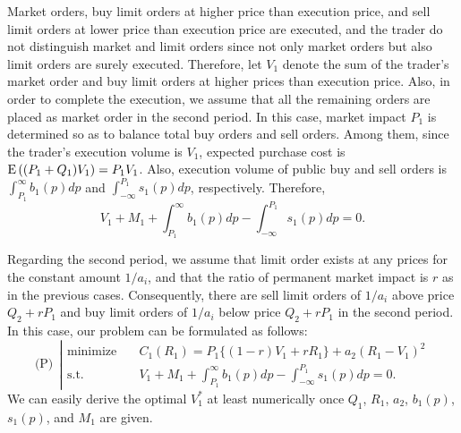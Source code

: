 Market orders, buy limit orders at higher price than execution price, and sell limit orders at lower price than execution price are executed, and the trader do not distinguish market and limit orders since not only market orders but also limit orders are surely executed.  Therefore, let $V_1$ denote the sum of the trader's market order and buy limit orders at higher prices than execution price.  Also, in order to complete the execution, we assume that all the remaining orders are placed as market order in the second period.  In this case, market impact $P_1$ is determined so as to balance total buy orders and sell orders.  Among them, since the trader's execution volume is $V_1$, expected purchase cost is ${\mathrm{E}}\left( (P_1+Q_1)V_1 \right)=P_1V_1$.  Also, execution volume of public buy and sell orders is $\displaystyle \int_{P_1}^{\infty} b_1(p) dp$ and $\displaystyle \int_{-\infty}^{P_1} s_1(p) dp$, respectively.  Therefore,
\[ %
  V_1+M_1+\int_{P_1}^{\infty} b_1(p) dp-\int_{-\infty}^{P_1} s_1(p) dp=0.
\] %

Regarding the second period, we assume that limit order exists at any prices for the constant amount $1/a_i$, and that the ratio of permanent market impact is $r$ as in the previous cases.  Consequently, there are sell limit orders of $1/a_i$ above price $Q_2+rP_1$ and buy limit orders of $1/a_i$ below price $Q_2+rP_1$ in the second period.  In this case, our problem can be formulated as follows:
\begin{equation}\label{eq_l25}
  \mbox{(P)} \ \ \left|
  \begin{array}{ll}
    \mbox{minimize} & \quad C_1(R_1)= P_1 \{(1-r) V_1 +r R_1\}+a_2(R_1-V_1)^2 \\
    \mbox{s.t.} & \displaystyle \quad V_1+M_1+\int_{P_1}^{\infty} b_1(p) dp-\int_{-\infty}^{P_1} s_1(p) dp=0.
  \end{array}
  \right.
\end{equation}
We can easily derive the optimal $V_1^*$ at least numerically once $Q_1$, $R_1$, $a_2$, $b_1(p)$, $s_1(p)$, and $M_1$ are given.



